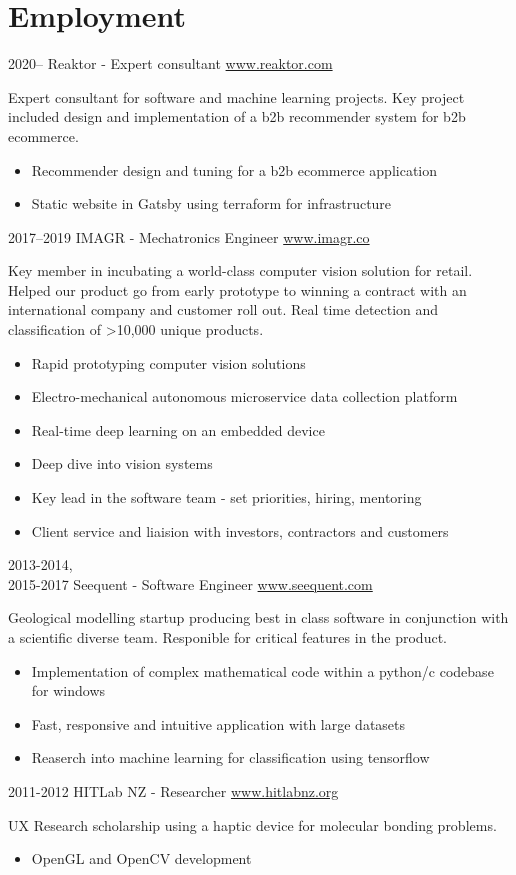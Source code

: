 \documentclass[print]{friggeri-cv} %
\begin{document}
\section{Employment}
\begin{entrylist}
\entry 
{2020--}
{Reaktor - Expert consultant}
{\href{www.reaktor.com}{www.reaktor.com}}
{Expert consultant for software and machine learning projects. Key project included design and implementation of a b2b recommender system for b2b ecommerce.
\begin{itemize}
\item Recommender design and tuning for a b2b ecommerce application
\item Static website in Gatsby using terraform for infrastructure
\end{itemize}
}

\entry
{2017--2019}
{IMAGR - Mechatronics Engineer}
{\href{www.imagr.co}{www.imagr.co}}
{Key member in incubating a world-class computer vision solution for retail. Helped our product go from early prototype to winning a contract with an international company and customer roll out. Real time detection and classification of >10,000 unique products.
\begin{itemize}
\item Rapid prototyping computer vision solutions
\item Electro-mechanical autonomous microservice data collection platform
\item Real-time deep learning on an embedded device
\item Deep dive into vision systems
\item Key lead in the software team - set priorities, hiring, mentoring
\item Client service and liaision with investors, contractors and customers
\end{itemize}
}

\entry
{2013-2014,\\2015-2017}
{Seequent - Software Engineer}
{\href{www.seequent.com}{www.seequent.com}}
{Geological modelling startup producing best in class software in conjunction with a scientific diverse team. Responible for critical features in the product.
\begin{itemize}
\item Implementation of complex mathematical code within a python/c codebase for windows
\item Fast, responsive and intuitive application with large datasets
\item Reaserch into machine learning for classification using tensorflow
\end{itemize}
}

\entry
{2011-2012}
{HITLab NZ - Researcher}
{\href{www.hitlabnz.org}{www.hitlabnz.org}}
{UX Research scholarship using a haptic device for molecular bonding problems.
\begin{itemize}
\item OpenGL and OpenCV development
\end{itemize}
}
\end{entrylist}\\ 
\end{document}
